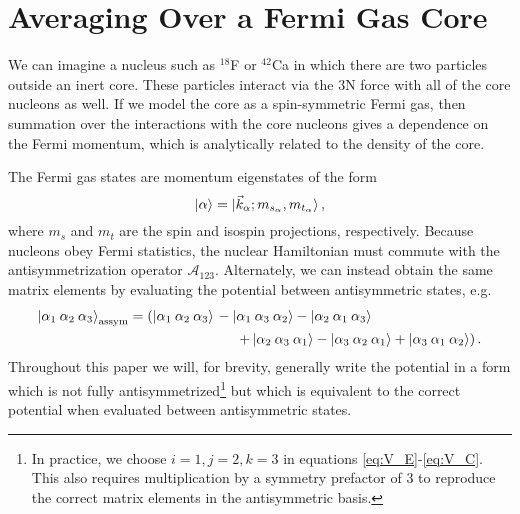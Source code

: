 \section{\label{sec:averaging}Averaging Over a Fermi Gas Core}

We can imagine a nucleus such as $^{18}$F or $^{42}$Ca in which there are two particles outside an inert core. These particles interact via the 3N force with all of the core nucleons as well. If we model the core as a spin-symmetric Fermi gas, then summation over the interactions with the core nucleons gives a dependence on the Fermi momentum, which is analytically related to the density of the core. 

The Fermi gas states are momentum eigenstates of the form
\begin{equation}
\ket{\alpha}=\ket{\vec{k}_\alpha;m_{s_\alpha},m_{t_\alpha}},
\end{equation}
where $m_s$ and $m_t$ are the spin and isospin projections, respectively. %
Because nucleons obey Fermi statistics, the nuclear Hamiltonian must commute with the antisymmetrization operator $\mathcal{A}_{123}$. Alternately, we can instead obtain the same matrix elements by evaluating the potential between antisymmetric states, e.g.
\begin{equation}
\begin{split}
\ket{\alpha_1\:\alpha_2\:\alpha_3}_{\text{assym}} = \left( \ket{\alpha_1\:\alpha_2\:\alpha_3}\right. & - \ket{\alpha_1\:\alpha_3\:\alpha_2} - \ket{\alpha_2\:\alpha_1\:\alpha_3}   \\
&\hspace{.5cm}\left. +\ket{\alpha_2\:\alpha_3\:\alpha_1} - \ket{\alpha_3\:\alpha_2\:\alpha_1} + \ket{\alpha_3\:\alpha_1\:\alpha_2} \right).
\end{split}
\end{equation}
Throughout this paper we will, for brevity, generally write the potential in a form which is not fully antisymmetrized\footnote{In practice, we choose $i=1,j=2,k=3$ in equations \eqref{eq:V_E}-\eqref{eq:V_C}. This also requires multiplication by a symmetry prefactor of 3 to reproduce the correct matrix elements in the antisymmetric basis. } but which is equivalent to the correct potential when evaluated between antisymmetric states.

